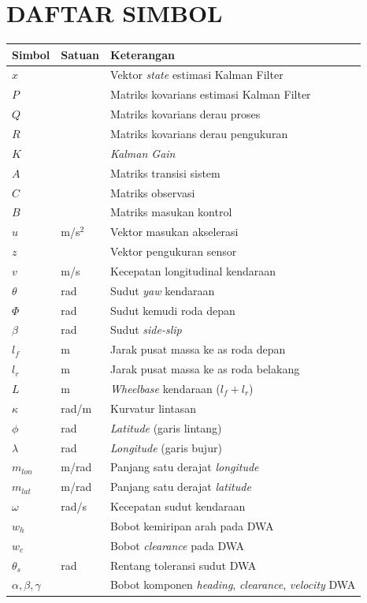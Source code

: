 \chapter*{DAFTAR SIMBOL}

\begin{longtable}{p{} p{} p{}}
\hline
\textbf{Simbol} & \textbf{Satuan} & \textbf{Keterangan} \\
\hline
\endhead
$\hat{x}$ & & Vektor \emph{state} estimasi Kalman Filter \\
$P$ & & Matriks kovarians estimasi Kalman Filter \\
$Q$ & & Matriks kovarians derau proses \\
$R$ & & Matriks kovarians derau pengukuran \\
$K$ & & \emph{Kalman Gain} \\
$A$ & & Matriks transisi sistem \\
$C$ & & Matriks observasi \\
$B$ & & Matriks masukan kontrol \\
$u$ & m/s$^2$ & Vektor masukan akselerasi \\
$z$ & & Vektor pengukuran sensor \\
$v$ & m/s & Kecepatan longitudinal kendaraan \\
$\theta$ & rad & Sudut \emph{yaw} kendaraan \\
$\Phi$ & rad & Sudut kemudi roda depan \\
$\beta$ & rad & Sudut \emph{side-slip} \\
$l_f$ & m & Jarak pusat massa ke as roda depan \\
$l_r$ & m & Jarak pusat massa ke as roda belakang \\
$L$ & m & \emph{Wheelbase} kendaraan ($l_f + l_r$) \\
$\kappa$ & rad/m & Kurvatur lintasan \\
$\phi$ & rad & \emph{Latitude} (garis lintang) \\
$\lambda$ & rad & \emph{Longitude} (garis bujur) \\
$m_{lon}$ & m/rad & Panjang satu derajat \emph{longitude} \\
$m_{lat}$ & m/rad & Panjang satu derajat \emph{latitude} \\
$\omega$ & rad/s & Kecepatan sudut kendaraan \\
$w_h$ & & Bobot kemiripan arah pada DWA \\
$w_c$ & & Bobot \emph{clearance} pada DWA \\
$\theta_s$ & rad & Rentang toleransi sudut DWA \\
$\alpha, \beta, \gamma$ & & Bobot komponen \emph{heading}, \emph{clearance}, \emph{velocity} DWA \\
\hline
\end{longtable}

